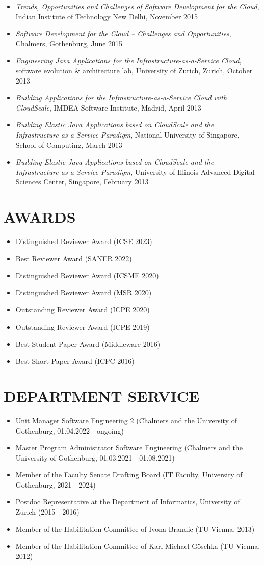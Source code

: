 \documentclass[paper=letter,fontsize=11pt]{scrartcl} %
\newcommand{\NewPart}[2]{\section*{\uppercase{#1} #2}}
\begin{document}
\begin{itemize}
\item \emph{Trends, Opportunities and Challenges of Software Development for the Cloud}, Indian Institute of Technology New Delhi, November 2015
\item \emph{Software Development for the Cloud -- Challenges and Opportunities}, Chalmers, Gothenburg, June 2015
\item \emph{Engineering Java Applications for the Infrastructure-as-a-Service Cloud}, software evolution \& architecture lab, University of Zurich, Zurich, October 2013
\item \emph{Building Applications for the Infrastructure-as-a-Service Cloud with CloudScale}, IMDEA Software Institute, Madrid, April 2013
\item \emph{Building Elastic Java Applications based on CloudScale and the Infrastructure-as-a-Service Paradigm}, National University of Singapore, School of Computing, March 2013
\item \emph{Building Elastic Java Applications based on CloudScale and the Infrastructure-as-a-Service Paradigm}, University of Illinois Advanced Digital Sciences Center, Singapore, February 2013
\end{itemize}

\NewPart{Awards}{}
\begin{itemize}
\item Distinguished Reviewer Award (ICSE 2023)  
\item Best Reviewer Award (SANER 2022)  
\item Distinguished Reviewer Award (ICSME 2020)  
\item Distinguished Reviewer Award (MSR 2020)
\item Outstanding Reviewer Award (ICPE 2020)
\item Outstanding Reviewer Award (ICPE 2019)
\item Best Student Paper Award (Middleware 2016)
\item Best Short Paper Award (ICPC 2016)
\end{itemize}


\NewPart{Department Service}{}
\begin{itemize}
\item Unit Manager Software Engineering 2 (Chalmers and the University of Gothenburg, 01.04.2022 - ongoing)  
\item Master Program Administrator Software Engineering (Chalmers and the University of Gothenburg, 01.03.2021 - 01.08.2021)
\item Member of the Faculty Senate Drafting Board (IT Faculty, University of Gothenburg, 2021 - 2024)
\item Postdoc Representative at the Department of Informatics, University of Zurich (2015 - 2016)
\item Member of the Habilitation Committee of Ivona Brandic (TU Vienna, 2013)
\item Member of the Habilitation Committee of Karl Michael G\"oschka (TU Vienna, 2012)
\end{itemize}
\end{document}
